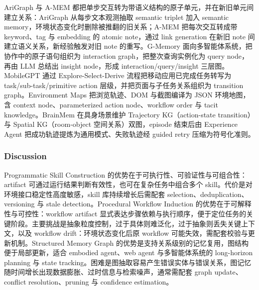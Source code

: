 AriGraph \cite{Ano24} 与 A-MEM \cite{Xu25b} 都把单步交互转为带语义结构的原子单元，并在新旧单元间建立关系：AriGraph 从每步文本观测抽取 semantic triplet 加入 semantic memory，环境状态变化时删除被推翻的旧关系；A-MEM 把每次交互转成带 keyword、tag 与 embedding 的 atomic note，通过 link generation 在新旧 note 间建立语义关系，新经验触发对旧 note 的重写。G-Memory \cite{Zha25} 面向多智能体系统，把协作中的原子语句组织为 interaction graph，把整次查询实例化为 query node，再由 LLM 总结出 insight node，形成 interaction/query/insight 三层图。MobileGPT \cite{Lee23} 通过 Explore-Select-Derive 流程把移动应用已完成任务转写为 task/sub-task/primitive action 层级，并把页面与子任务关系组织为 transition graph。Environment Maps \cite{Fen26} 把浏览轨迹、DOM 与截图编译为 JSON 环境地图，含 context node、parameterized action node、workflow order 与 tacit knowledge。BrainMem \cite{Ma26} 在具身场景维护 Trajectory KG（action-state transition）与 Spatial KG（room-object 空间关系）双图，episode 结束后由 Experience Agent 把成功轨迹提炼为通用模式、失败轨迹经 guided retry 压缩为符号化准则。



\subsubsection{Discussion}

Programmatic Skill Construction 的优势在于可执行性、可验证性与可组合性：artifact 可通过运行结果判断有效性，也可在复杂任务中组合多个 skill。代价是对环境接口稳定性高度敏感，skill 库持续增长后需配套 selection、deduplication、versioning 与 stale detection。Procedural Workflow Induction 的优势在于可解释性与可控性：workflow artifact 显式表达步骤依赖与执行顺序，便于定位任务的关键阶段。主要挑战是抽象粒度控制，过于具体则难泛化，过于抽象则丢失关键上下文，以及 workflow drift：环境状态变化后原 workflow 可能失效，需配套校验与更新机制。Structured Memory Graph 的优势是支持关系级别的记忆复用，图结构便于局部更新，适合 embodied agent、web agent 与多智能体系统的 long-horizon planning 与 state tracking。困难是图抽取容易产生错误实体与错误关系，图记忆随时间增长出现数据膨胀、过时信息与检索噪声，通常需配套 graph update、conflict resolution、pruning 与 confidence estimation。

